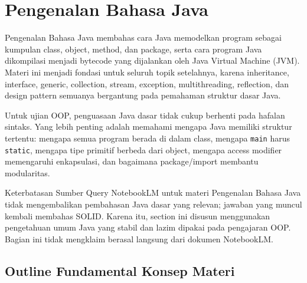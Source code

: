 \section{Pengenalan Bahasa Java}

Pengenalan Bahasa Java membahas cara Java memodelkan program sebagai kumpulan class, object, method, dan package, serta cara program Java dikompilasi menjadi bytecode yang dijalankan oleh Java Virtual Machine (JVM). Materi ini menjadi fondasi untuk seluruh topik setelahnya, karena inheritance, interface, generic, collection, stream, exception, multithreading, reflection, dan design pattern semuanya bergantung pada pemahaman struktur dasar Java.

Untuk ujian OOP, penguasaan Java dasar tidak cukup berhenti pada hafalan sintaks. Yang lebih penting adalah memahami mengapa Java memiliki struktur tertentu: mengapa semua program berada di dalam class, mengapa \texttt{main} harus \texttt{static}, mengapa tipe primitif berbeda dari object, mengapa access modifier memengaruhi enkapsulasi, dan bagaimana package/import membantu modularitas.

\begin{cmt}{Keterbatasan Sumber}{}
Query NotebookLM untuk materi Pengenalan Bahasa Java tidak mengembalikan pembahasan Java dasar yang relevan; jawaban yang muncul kembali membahas SOLID. Karena itu, section ini disusun menggunakan pengetahuan umum Java yang stabil dan lazim dipakai pada pengajaran OOP. Bagian ini tidak mengklaim berasal langsung dari dokumen NotebookLM.
\end{cmt}

\subsection{Outline Fundamental Konsep Materi}

